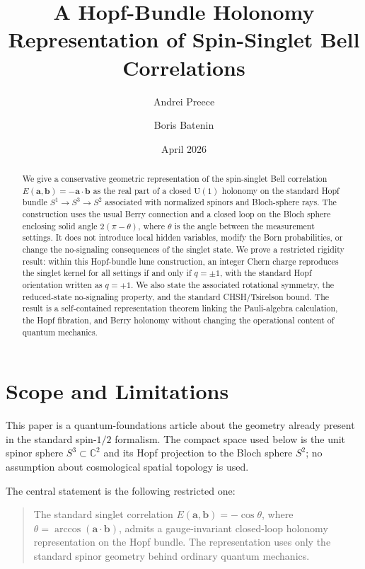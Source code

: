 \documentclass[
  aps,
  pra,
  reprint,
  superscriptaddress,
  nofootinbib,
  longbibliography,
  floatfix,
  amsmath,
  amssymb
]{revtex4-2}
\theoremstyle{plain}
\theoremstyle{definition}
\theoremstyle{remark}
\newcommand{\UU}{\mathrm{U}}
\newcommand{\CC}{\mathbb{C}}
\begin{document}
\title{A Hopf-Bundle Holonomy Representation of Spin-Singlet Bell Correlations}

\author{Andrei Preece}
\author{Boris Batenin}
\date{April 2026}

\begin{abstract}
We give a conservative geometric representation of the spin-singlet Bell correlation
\(E(\bm a,\bm b)=-\bm a\cdot\bm b\) as the real part of a closed \(\UU(1)\) holonomy on the standard Hopf bundle \(S^1\to S^3\to S^2\) associated with normalized spinors and Bloch-sphere rays.  The construction uses the usual Berry connection and a closed loop on the Bloch sphere enclosing solid angle \(2(\pi-\theta)\), where \(\theta\) is the angle between the measurement settings.  It does not introduce local hidden variables, modify the Born probabilities, or change the no-signaling consequences of the singlet state.  We prove a restricted rigidity result: within this Hopf-bundle lune construction, an integer Chern charge reproduces the singlet kernel for all settings if and only if \(q=\pm1\), with the standard Hopf orientation written as \(q=+1\).  We also state the associated rotational symmetry, the reduced-state no-signaling property, and the standard CHSH/Tsirelson bound.  The result is a self-contained representation theorem linking the Pauli-algebra calculation, the Hopf fibration, and Berry holonomy without changing the operational content of quantum mechanics.
\end{abstract}

\maketitle

\section{Scope and Limitations}
\label{sec:purpose}

This paper is a quantum-foundations article about the geometry already present in the standard spin-\(1/2\) formalism.  The compact space used below is the unit spinor sphere \(S^3\subset\CC^2\) and its Hopf projection to the Bloch sphere \(S^2\); no assumption about cosmological spatial topology is used.

The central statement is the following restricted one:
\begin{quote}
The standard singlet correlation \(E(\bm a,\bm b)=-\cos\theta\), where \(\theta=\arccos(\bm a\cdot\bm b)\), admits a gauge-invariant closed-loop holonomy representation on the Hopf bundle.  The representation uses only the standard spinor geometry behind ordinary quantum mechanics.
\end{quote}
\end{document}
